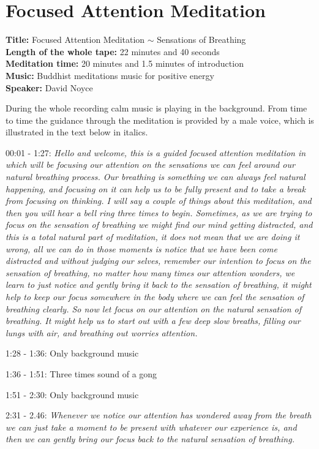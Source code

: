 \chapter{Focused Attention Meditation}
\textbf{Title:} Focused Attention Meditation $\sim$  Sensations of Breathing  \\
\textbf{Length of the whole tape:} 22 minutes and 40 seconds \\
\textbf{Meditation time:} 20 minutes and 1.5 minutes of introduction \\
\textbf{Music:} Buddhist meditations music for positive energy  \\
\textbf{Speaker:} David Noyce 

During the whole recording calm music is playing in the background. From time to time the guidance through the meditation is provided by a male voice, which is illustrated in the text below in italics. 


00:01 - 1:27: \textit{Hello and welcome, this is a guided focused attention meditation in which will be focusing our attention on the sensations we can feel around our natural breathing process. Our breathing is something we can always feel natural happening, and focusing on it can help us to be fully present and to take a break from focusing on thinking. I will say a couple of things about this meditation, and then you will hear a bell ring three times to begin. Sometimes, as we are trying to focus on the sensation of breathing we might find our mind getting distracted, and this is a total natural part of meditation, it does not mean that we are doing it wrong, all we can do in those moments is notice that we have been come distracted and without judging our selves, remember our intention to focus on the sensation of breathing, no matter how many times our attention wonders, we learn to just notice and gently bring it back to the sensation of breathing, it might help to keep our focus somewhere in the body where we can feel the sensation of breathing clearly. So now let focus on our attention on the natural sensation of breathing. It might help us to start out with a few deep slow breaths, filling our lungs with air, and breathing out worries attention.}

1:28 - 1:36: Only background music 

1:36 - 1:51: Three times sound of a gong 

1:51 - 2:30: Only background music

2:31 - 2.46: \textit{Whenever we notice our attention has wondered away from the breath we can just take a moment to be present with whatever our experience is, and then we can gently bring our focus back to the natural sensation of breathing. }

